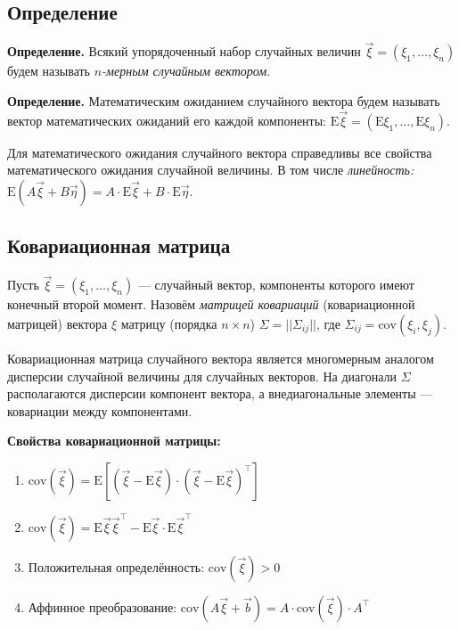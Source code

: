 \documentclass[11pt,a4paper]{article}
\providecommand{\tightlist}{%
      \setlength{\itemsep}{0pt}\setlength{\parskip}{0pt}}
\begin{document}
    \hypertarget{ux43eux43fux440ux435ux434ux435ux43bux435ux43dux438ux435}{%
\subsection{Определение}\label{ux43eux43fux440ux435ux434ux435ux43bux435ux43dux438ux435}}

\textbf{Определение.} Всякий упорядоченный набор случайных величин
\(\vec{\xi} = (\xi_1, \ldots, \xi_n)\) будем называть \emph{\(n\)-мерным
случайным вектором}.

\textbf{Определение.} Математическим ожиданием случайного вектора будем
называть вектор математических ожиданий его каждой компоненты:
\(\mathrm{E}\vec{\xi} = (\mathrm{E}\xi_1, \ldots, \mathrm{E}\xi_n)\).

Для математического ожидания случайного вектора справедливы все свойства
математического ожидания случайной величины. В том числе
\emph{линейность:}
\(\mathrm{E}(A\vec{\xi} + B\vec{\eta}) = A \cdot \mathrm{E}\vec{\xi} + B \cdot \mathrm{E}\vec{\eta}\).

    \hypertarget{ux43aux43eux432ux430ux440ux438ux430ux446ux438ux43eux43dux43dux430ux44f-ux43cux430ux442ux440ux438ux446ux430}{%
\subsection{Ковариационная
матрица}\label{ux43aux43eux432ux430ux440ux438ux430ux446ux438ux43eux43dux43dux430ux44f-ux43cux430ux442ux440ux438ux446ux430}}

Пусть \(\vec\xi = \left( \xi_1, \dots, \xi_n \right)\) --- случайный
вектор, компоненты которого имеют конечный второй момент. Назовём
\emph{матрицей ковариаций} (ковариационной матрицей) вектора \(\xi\)
матрицу (порядка \(n \times n\)) \(\Sigma = ||\Sigma_{ij}||\), где
\(\Sigma_{ij} = \text{cov}\left( \xi_i, \xi_j \right)\).

Ковариационная матрица случайного вектора является многомерным аналогом
дисперсии случайной величины для случайных векторов. На диагонали
\(\Sigma\) располагаются дисперсии компонент вектора, а внедиагональные
элементы --- ковариации между компонентами.

    \textbf{Свойства ковариационной матрицы:}

\begin{enumerate}
\def\labelenumi{\arabic{enumi}.}
\tightlist
\item
  \(\mathrm{cov}(\vec\xi) = \mathrm{E} \left[ (\vec\xi -\mathrm{E}\vec\xi) \cdot (\vec\xi -\mathrm{E}\vec\xi)^\top \right]\)
\item
  \(\mathrm{cov}(\vec\xi) = \mathrm{E} \vec\xi \vec\xi^\top - \mathrm{E} \vec\xi \cdot \mathrm{E} \vec\xi^\top\)
\item
  Положительная определённость: \(\mathrm{cov}(\vec\xi) > 0\)
\item
  Аффинное преобразование:
  \(\mathrm{cov}(A\vec\xi + \vec{b}) = A \cdot \mathrm{cov}(\vec\xi) \cdot A^\top\)
\end{enumerate}
\end{document}
